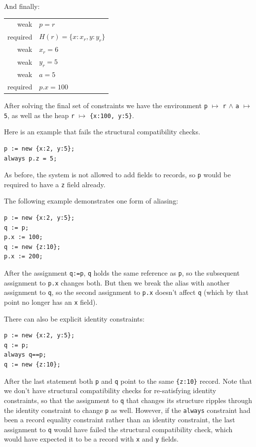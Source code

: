 \documentclass{article}
\begin{document}
And finally:

\begin{tabular}{rl}
weak & $p = r$ \\
required & $H(r) = \{x:x_r, y:y_r\}$\\
weak & $x_r = 6$\\
weak & $y_r = 5$\\
weak & $a = 5$ \\
required & $p.x = 100$
\end{tabular}

After solving the final set of constraints we have the environment 
\verb|p| $\mapsto$ \verb|r| $\wedge$
\verb|a| $\mapsto$ \verb|5|, as well as the heap \linebreak \verb|r| $\mapsto$
\verb|{x:100, y:5}|.

Here is an example that fails the structural compatibility checks.

\begin{verbatim}
p := new {x:2, y:5};
always p.z = 5;
\end{verbatim}

As before, the system is not allowed to add fields to records, so \verb|p|
would be required to have a \verb|z| field already.

The following example demonstrates one form of aliasing:
\begin{verbatim}
p := new {x:2, y:5};
q := p;
p.x := 100;
q := new {z:10};
p.x := 200;
\end{verbatim}

After the assignment \verb|q:=p|, \verb|q| holds the same reference as
\verb|p|, so the subsequent assignment to \verb|p.x| changes both.
But then we break the alias with another assignment to \verb|q|, so
the second assignment to \verb|p.x| doesn't affect \verb|q| (which by
that point no longer has an \verb|x| field).

There can also be explicit identity constraints:
\begin{verbatim}
p := new {x:2, y:5};
q := p;
always q==p;
q := new {z:10};
\end{verbatim}
After the last statement both \verb|p| and \verb|q| point to the same
\verb|{z:10}| record.  Note that we don't have structural
compatibility checks for re-satisfying identity constraints, so that
the assignment to \verb|q| that changes its structure ripples through
the identity constraint
to change \verb|p| as well.  However, if the \verb|always| constraint
had been a record equality constraint rather than an identity
constraint, the last assignment to \verb|q| would have failed the
structural compatibility check, which would have expected it to be a
record with \verb|x| and \verb|y| fields.
\end{document}
